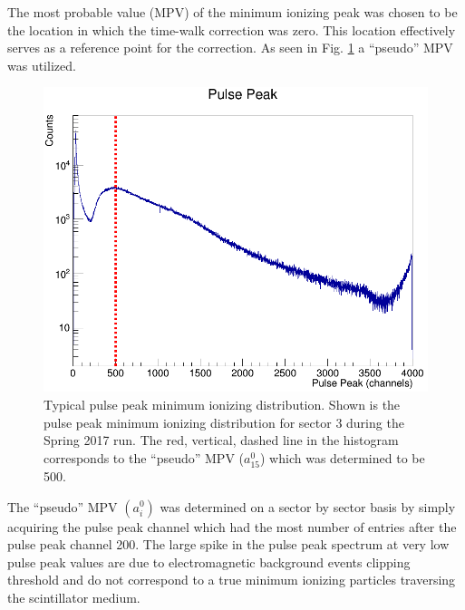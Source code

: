 The most probable value (MPV) of the minimum ionizing peak was chosen to be the location in which the time-walk correction was zero.  This location effectively serves as a reference point for the correction.  As seen in Fig. \ref{fig:pulsepeakch15} a ``pseudo'' MPV was utilized.
	\begin{figure}[!htb]
		\centering
		\includegraphics[width=1.0\columnwidth]{calibration/figs/pulse_peak_ch15}
		\caption{Typical pulse peak minimum ionizing distribution.  Shown is the pulse peak minimum ionizing distribution for sector 3 during the Spring 2017 run. The red, vertical, dashed line in the histogram corresponds to the ``pseudo'' MPV ($a^{0}_{15}$) which was determined to be 500.}
		\label{fig:pulsepeakch15}
	\end{figure}
The ``pseudo'' MPV $(a^{0}_{i})$ was determined on a sector by sector basis by simply acquiring the pulse peak channel which had the most number of entries after the pulse peak channel 200.  The large spike in the pulse peak spectrum at very low pulse peak values are due to electromagnetic background events clipping threshold and do not correspond to a true minimum ionizing particles traversing the scintillator medium.

